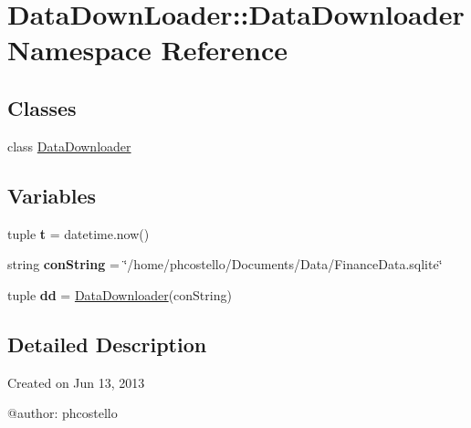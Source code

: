 \hypertarget{namespaceDataDownLoader_1_1DataDownloader}{\section{\-Data\-Down\-Loader\-:\-:\-Data\-Downloader \-Namespace \-Reference}
\label{namespaceDataDownLoader_1_1DataDownloader}
}
\subsection*{\-Classes}
\begin{DoxyCompactItemize}
\item 
class \hyperlink{classDataDownLoader_1_1DataDownloader_1_1DataDownloader}{\-Data\-Downloader}
\end{DoxyCompactItemize}
\subsection*{\-Variables}
\begin{DoxyCompactItemize}
\item 
\hypertarget{namespaceDataDownLoader_1_1DataDownloader_af1cedd2c4d8ed031d2491465922d6e1a}{tuple {\bfseries t} = datetime.\-now()}\label{namespaceDataDownLoader_1_1DataDownloader_af1cedd2c4d8ed031d2491465922d6e1a}

\item 
\hypertarget{namespaceDataDownLoader_1_1DataDownloader_ac4242b88a28dac67605d9e4ced4acc03}{string {\bfseries con\-String} = \char`\"{}/home/phcostello/\-Documents/\-Data/\-Finance\-Data.\-sqlite\char`\"{}}\label{namespaceDataDownLoader_1_1DataDownloader_ac4242b88a28dac67605d9e4ced4acc03}

\item 
\hypertarget{namespaceDataDownLoader_1_1DataDownloader_a96d6b917800087d5aea755adbc192473}{tuple {\bfseries dd} = \hyperlink{classDataDownLoader_1_1DataDownloader_1_1DataDownloader}{\-Data\-Downloader}(con\-String)}\label{namespaceDataDownLoader_1_1DataDownloader_a96d6b917800087d5aea755adbc192473}

\end{DoxyCompactItemize}


\subsection{\-Detailed \-Description}
\begin{DoxyVerb}
Created on Jun 13, 2013

@author: phcostello
\end{DoxyVerb}
 